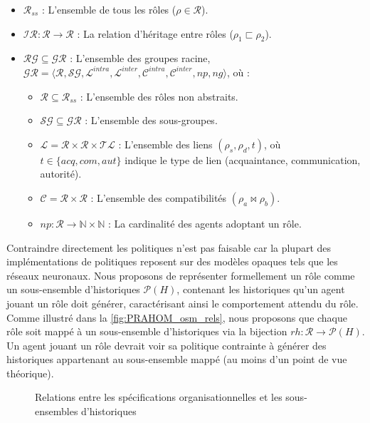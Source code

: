 \documentclass[sigconf,anonymous]{aamas}
\begin{document}
\begin{itemize}
    \item $\mathcal{R}_{ss}$ : L'ensemble de tous les rôles ($\rho \in \mathcal{R}$).
    \item $\mathcal{IR}: \mathcal{R} \rightarrow \mathcal{R}$ : La relation d'héritage entre rôles ($\rho_1 \sqsubset \rho_2$).
    \item $\mathcal{RG} \subseteq \mathcal{GR}$ : L'ensemble des groupes racine, $\mathcal{GR} = \langle \mathcal{R}, \mathcal{SG}, \mathcal{L}^{intra}, \mathcal{L}^{inter}, \mathcal{C}^{intra}, \mathcal{C}^{inter}, np, ng \rangle$, où :
          \begin{itemize}
          \item $\mathcal{R} \subseteq \mathcal{R}_{ss}$ : L'ensemble des rôles non abstraits.
          \item $\mathcal{SG} \subseteq \mathcal{GR}$ : L'ensemble des sous-groupes.
          \item $\mathcal{L} = \mathcal{R} \times \mathcal{R} \times \mathcal{TL}$ : L'ensemble des liens $(\rho_s, \rho_d, t)$, où $t \in \{acq, com, aut\}$ indique le type de lien (acquaintance, communication, autorité).
          \item $\mathcal{C} = \mathcal{R} \times \mathcal{R}$ : L'ensemble des compatibilités $(\rho_a \bowtie \rho_b)$.
          \item $np: \mathcal{R} \rightarrow \mathbb{N} \times \mathbb{N}$ : La cardinalité des agents adoptant un rôle.
          \end{itemize}
\end{itemize}

Contraindre directement les politiques n'est pas faisable car la plupart des implémentations de politiques reposent sur des modèles opaques tels que les réseaux neuronaux. Nous proposons de représenter formellement un rôle comme un sous-ensemble d'historiques $\mathcal{P}(H)$, contenant les historiques qu'un agent jouant un rôle doit générer, caractérisant ainsi le comportement attendu du rôle. Comme illustré dans la \autoref{fig:PRAHOM_osm_rels}, nous proposons que chaque rôle soit mappé à un sous-ensemble d'historiques via la bijection $rh: \mathcal{R} \rightarrow \mathcal{P}(H)$. Un agent jouant un rôle devrait voir sa politique contrainte à générer des historiques appartenant au sous-ensemble mappé (au moins d'un point de vue théorique).

\begin{figure}[h!]
    \centering
    
    \caption{Relations entre les spécifications organisationnelles et les sous-ensembles d'historiques}
    \label{fig:PRAHOM_osm_rels}
\end{figure}
\end{document}
